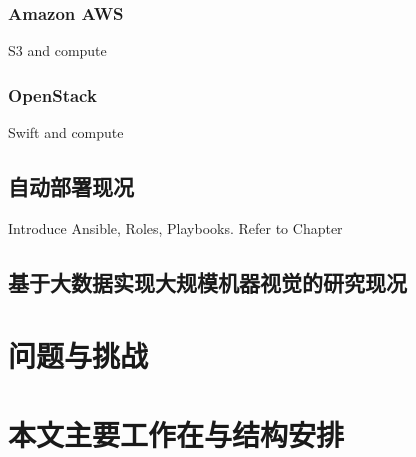 \subsubsection{Amazon AWS}
S3 and compute

\subsubsection{OpenStack}
\label{subsubsec:openstack}
Swift and compute

\subsection{自动部署现况}
\label{subsec:automated_deployment}

Introduce Ansible, Roles, Playbooks. Refer to Chapter

\subsection{基于大数据实现大规模机器视觉的研究现况}
\label{subsec:bigdata_cv_background}

\section{问题与挑战}
\label{sec:challenges}

\section{本文主要工作在与结构安排}
\label{sec:main_work}
